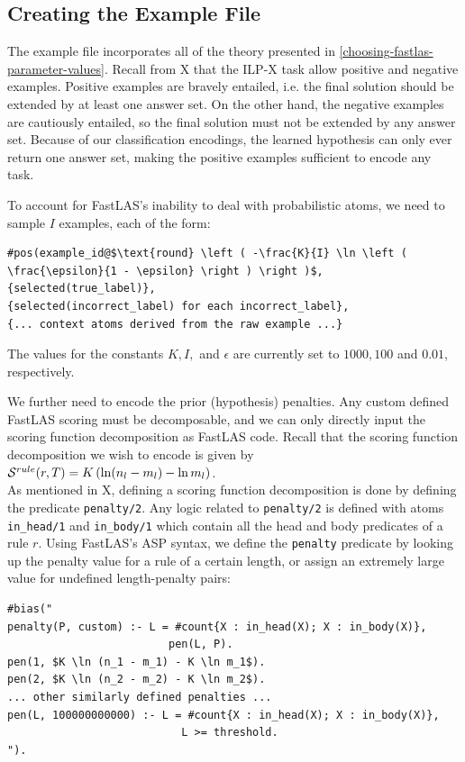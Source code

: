 \subsection{Creating the Example File}

The example file incorporates all of the theory presented in \ref{choosing-fastlas-parameter-values}.
Recall from X that the ILP-X task allow positive and negative examples.
Positive examples are bravely entailed, i.e. the final solution should be extended by at least one answer set.
On the other hand, the negative examples are cautiously entailed, so the final solution must not be extended by any answer set.
Because of our classification encodings, the learned hypothesis can only ever return one answer set, making the positive examples sufficient to encode any task.

To account for FastLAS's inability to deal with probabilistic atoms, we need to sample $I$ examples, each of the form:
\begin{lstlisting}
#pos(example_id@$\text{round} \left ( -\frac{K}{I} \ln \left ( \frac{\epsilon}{1 - \epsilon} \right ) \right )$,
{selected(true_label)},
{selected(incorrect_label) for each incorrect_label}, 
{... context atoms derived from the raw example ...}
\end{lstlisting}

The values for the constants $K, I,$ and $\epsilon$ are currently set to $1000, 100$ and $0.01$, respectively.

We further need to encode the prior (hypothesis) penalties.
Any custom defined FastLAS scoring must be decomposable, and we can only directly input the scoring function decomposition as FastLAS code.
Recall that the scoring function decomposition we wish to encode is given by $\mathcal{S}^{rule}(r, T) = K \left (\ln (n_l - m_l) - \ln m_l  \right)$.  \\
As mentioned in X, defining a scoring function decomposition is done by defining the predicate \verb_penalty/2_. Any logic related to \verb_penalty/2_ is defined with atoms \verb+in_head/1+ and \verb+in_body/1+ which contain all the head and body predicates of a rule $r$.
Using FastLAS's ASP syntax, we define the \verb_penalty_ predicate by looking up the penalty value for a rule of a certain length, or assign an extremely large value for undefined length-penalty pairs:
\begin{lstlisting}
#bias("
penalty(P, custom) :- L = #count{X : in_head(X); X : in_body(X)}, 
                         pen(L, P).
pen(1, $K \ln (n_1 - m_1) - K \ln m_1$).
pen(2, $K \ln (n_2 - m_2) - K \ln m_2$).
... other similarly defined penalties ...
pen(L, 100000000000) :- L = #count{X : in_head(X); X : in_body(X)}, 
                           L >= threshold.
").
\end{lstlisting}


